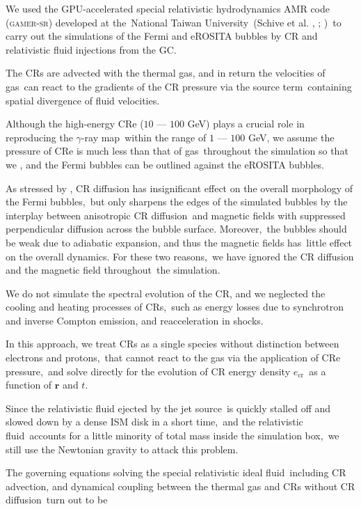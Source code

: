 \documentclass[twocolumn]{aastex631}
\begin{document}
  We used the GPU-accelerated special relativistic hydrodynamics AMR code (\textsc{gamer-sr}) developed at the\
  National Taiwan University\
  (Schive et al. \citeyear{gamer-1}, \citeyear{gamer-2}; \citeauthor{tseng2021} \citeyear{tseng2021})\
  to carry out the simulations of the Fermi and eROSITA bubbles by CR and relativistic fluid injections from the GC.

  The CRs are advected with the thermal gas, and in return the velocities of gas\
  can react to the gradients of the CR pressure via the source term\
  containing spatial divergence of fluid velocities.\

  Although the high-energy CRe ($10$ --- $100$ GeV) plays a crucial role in reproducing the $\gamma$-ray map\
  within the range of $1$ --- $100$ GeV, we assume the pressure of CRe is much less than that of gas\
  throughout the simulation so that we , and the Fermi bubbles can be outlined against the eROSITA bubbles.

  As stressed by \citet{Yang2012}, CR diffusion has insignificant effect on the overall morphology of the Fermi bubbles,\
  but only sharpens the edges of the simulated bubbles by the interplay between anisotropic CR diffusion\
  and magnetic fields with suppressed perpendicular diffusion across the bubble surface. Moreover,\
  the bubbles should be weak due to adiabatic expansion, and thus the magnetic fields has\
  little effect on the overall dynamics. For these two reasons,\
  we have ignored the CR diffusion and the magnetic field throughout\
  the simulation.

  We do not simulate the spectral evolution of the CR, and we neglected the cooling and heating processes of CRs,\
  such as energy losses due to synchrotron and inverse Compton emission, and reacceleration in shocks.\

  In this approach, we treat CRs as a single species without distinction between electrons and protons,\
  that cannot react to the gas via the application of CRe pressure,\
  and solve directly for the evolution of CR energy density $e_{\text{cr}}$\
  as a function of $\mathbf{r}$ and $t$.\

  Since the relativistic fluid ejected by the jet source\
  is quickly stalled off and slowed down by a dense ISM disk in a short time,\
  and the relativistic fluid\
  accounts for a little minority of total mass inside the simulation box,\
  we still use the Newtonian gravity to attack this problem.

  The governing equations solving the special relativistic ideal fluid\
  including CR advection, and dynamical coupling between the thermal gas and CRs without CR diffusion\
  turn out to be
\end{document}
